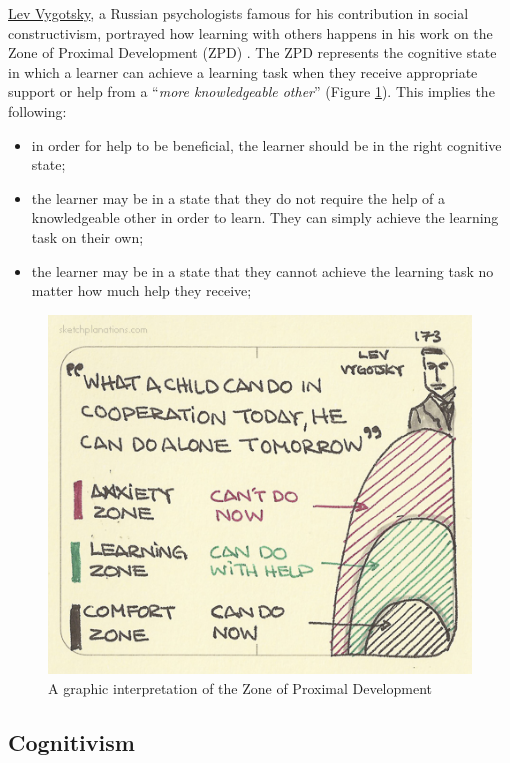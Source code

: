 \documentclass[
]{book}
\providecommand{\tightlist}{%
  \setlength{\itemsep}{0pt}\setlength{\parskip}{0pt}}
\begin{document}
\href{https://en.wikipedia.org/wiki/Lev_Vygotsky}{Lev Vygotsky}, a Russian psychologists famous for his contribution in social constructivism, portrayed how learning with others happens in his work on the Zone of Proximal Development (ZPD) \citep{cole1978mind}. The ZPD represents the cognitive state in which a learner can achieve a learning task when they receive appropriate support or help from a ``\emph{more knowledgeable other}'' (Figure \ref{fig:zpd}). This implies the following:

\begin{itemize}
\tightlist
\item
  in order for help to be beneficial, the learner should be in the right cognitive state;
\item
  the learner may be in a state that they do not require the help of a knowledgeable other in order to learn. They can simply achieve the learning task on their own;
\item
  the learner may be in a state that they cannot achieve the learning task no matter how much help they receive;
\end{itemize}

\begin{figure}
\includegraphics[width=13cm]{./images/zpd} \caption{A graphic interpretation of the Zone of Proximal Development}\label{fig:zpd}
\end{figure}

\subsection{Cognitivism}\label{cognitivism}
\end{document}
